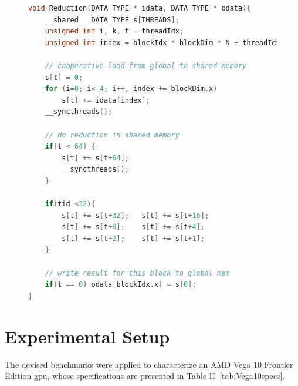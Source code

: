 \begin{figure}[htb]
\begin{lstlisting}[language=C, caption=Reduction Kernel Code, label=lst:Redbench, basicstyle=\footnotesize\ttfamily,abovecaptionskip=0pt, captionpos=b]
void Reduction(DATA_TYPE * idata, DATA_TYPE * odata){
    __shared__ DATA_TYPE s[THREADS];
    unsigned int i, k, t = threadIdx;
    unsigned int index = blockIdx * blockDim * N + threadIdx;
    
    // cooperative load from global to shared memory
    s[t] = 0;
    for (i=0; i< 4; i++, index += blockDim.x)
        s[t] += idata[index];
    __syncthreads();
    
    // do reduction in shared memory
    if(t < 64) {
        s[t] += s[t+64]; 
        __syncthreads(); 
    }
    
    if(tid <32){
        s[t] += s[t+32];   s[t] += s[t+16];
        s[t] += s[t+8];    s[t] += s[t+4];
        s[t] += s[t+2];    s[t] += s[t+1];
    }
    
    // write result for this block to global mem
    if(t == 0) odata[blockIdx.x] = s[0];
}
\end{lstlisting}
\end{figure}


\section{Experimental Setup}

The devised benchmarks were applied to characterize an AMD Vega 10 Frontier Edition \acrshort{gpu}, whose specifications are presented in Table II~\ref{tab:Vega10specs}. 

